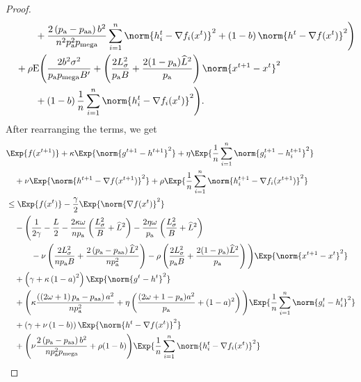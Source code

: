 \documentclass{article}
\newcommand*{\probavailable}{\ensuremath{p_{\textnormal{a}}}}
\newcommand*{\probpairaa}{\ensuremath{p_{\textnormal{aa}}}}
\newcommand*{\probmega}{\ensuremath{p_{\text{mega}}}}
\begin{document}
\begin{proof}
\begin{align*}
      &\qquad\quad + \frac{2\left(\probavailable - \probpairaa\right) b^2}{n^2 \probavailable^2 \probmega}\sum_{i=1}^n\norm{h^t_i -  \nabla f_i(x^{t})}^2 + \left(1 - b\right) \norm{h^{t} - \nabla f(x^{t})}^2\Bigg) \\
      &\quad  + \rho {\rm E}\Bigg(\frac{2 b^2 \sigma^2}{\probavailable \probmega B'} + \left(\frac{2 L_{\sigma}^2}{\probavailable B} + \frac{2(1 - \probavailable) \widehat{L}^2}{\probavailable}\right) \norm{x^{t+1} - x^{t}}^2\\
      &\qquad\quad + \left(1 - b\right) \frac{1}{n} \sum_{i=1}^n \norm{h^{t}_i - \nabla f_i(x^{t})}^2\Bigg).
  \end{align*}
  After rearranging the terms, we get
  \begin{align*}
    &\Exp{f(x^{t + 1})} + \kappa \Exp{\norm{g^{t+1} - h^{t+1}}^2} + \eta \Exp{\frac{1}{n}\sum_{i=1}^n\norm{g^{t+1}_i - h^{t+1}_i}^2}\\
    &\quad  + \nu \Exp{\norm{h^{t+1} - \nabla f(x^{t+1})}^2} + \rho \Exp{\frac{1}{n}\sum_{i=1}^n\norm{h^{t+1}_i - \nabla f_i(x^{t+1})}^2}\\
    &\leq \Exp{f(x^t)} - \frac{\gamma}{2}\Exp{\norm{\nabla f(x^t)}^2} \\
    &\quad - \Bigg(\frac{1}{2\gamma} - \frac{L}{2} - \frac{2 \kappa  \omega}{n \probavailable}\left(\frac{L_{\sigma}^2}{B} + \widehat{L}^2\right) - \frac{2\eta \omega}{\probavailable} \left(\frac{L_{\sigma}^2}{B} + \widehat{L}^2\right) \\
    &\qquad\quad - \nu \left(\frac{2 L_{\sigma}^2}{n \probavailable B} + \frac{2\left(\probavailable - \probpairaa\right) \widehat{L}^2}{n \probavailable^2}\right) - \rho \left(\frac{2 L_{\sigma}^2}{\probavailable B} + \frac{2(1 - \probavailable) \widehat{L}^2}{\probavailable}\right)\Bigg) \Exp{\norm{x^{t+1} - x^t}^2} \\
    &\quad + \left(\gamma + \kappa \left(1 - a\right)^2\right) \Exp{\norm{g^{t} - h^{t}}^2} \\
    &\quad + \Bigg(\kappa \frac{\left(\left(2 \omega + 1\right)\probavailable - \probpairaa\right)a^2}{n \probavailable^2} + \eta \left(\frac{(2\omega + 1 - \probavailable) a^2}{\probavailable} + (1 - a)^2\right)\Bigg)\Exp{\frac{1}{n}\sum_{i=1}^n\norm{g^{t}_i - h^{t}_i}^2} \\
    &\quad + \left(\gamma + \nu \left(1 - b\right)\right) \Exp{\norm{h^{t} - \nabla f(x^{t})}^2} \\
    &\quad + \Bigg(\nu \frac{2\left(\probavailable - \probpairaa\right) b^2}{n \probavailable^2 \probmega} + \rho (1 - b)\Bigg)\Exp{\frac{1}{n}\sum_{i=1}^n\norm{h^{t}_i - \nabla f_i(x^{t})}^2} \\

\end{align*}
\end{proof}
\end{document}
